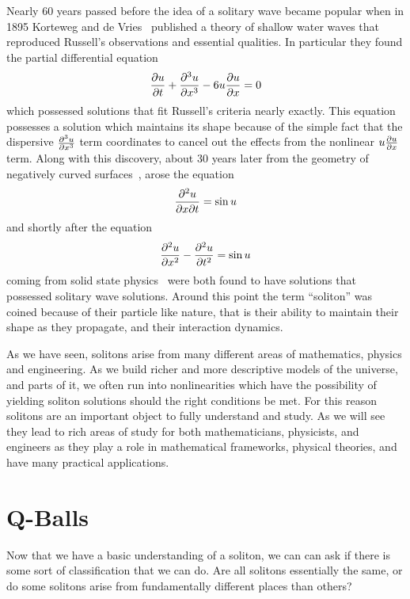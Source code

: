 Nearly 60 years passed before the idea of a solitary wave became popular when
in 1895 Korteweg and de Vries~\cite{KDV} published a theory of shallow water
waves that reproduced Russell's observations and essential qualities. In
particular they found the partial differential equation
\begin{equation}
    \pdv{u}{t} + \pdv[3]{u}{x} - 6 u \pdv{u}{x} = 0
\end{equation}
which possessed solutions that fit Russell's criteria nearly exactly. This
equation possesses a solution which maintains its shape because of the simple
fact that the dispersive \(\pdv[3]{u}{x}\) term coordinates to cancel out the
effects from the nonlinear \(u\pdv{u}{x}\) term. Along with this discovery,
about 30 years later from the geometry of negatively curved
surfaces~\cite{curvedsurf}, arose the equation
\begin{equation}
    \pdv[2]{u}{x}{t} = \sin{u}
\end{equation}
and shortly after the equation
\begin{equation}
    \pdv[2]{u}{x} - \pdv[2]{u}{t} = \sin{u}
\end{equation}
coming from solid state physics~\cite{sinegordon} were both found to have
solutions that possessed solitary wave solutions. Around this point the term
``soliton'' was coined because of their particle like nature, that is their
ability to maintain their shape as they propagate, and their interaction
dynamics.

As we have seen, solitons arise from many different areas of mathematics,
physics and engineering. As we build richer and more descriptive models of the
universe, and parts of it, we often run into nonlinearities which have the
possibility of yielding soliton solutions should the right conditions be met.
For this reason solitons are an important object to fully understand and study.
As we will see they lead to rich areas of study for both mathematicians,
physicists, and engineers as they play a role in mathematical frameworks,
physical theories, and have many practical applications.

\section{Q-Balls}\label{sec:qballintro}
Now that we have a basic understanding of a soliton, we can can ask if there is
some sort of classification that we can do. Are all solitons essentially the
same, or do some solitons arise from fundamentally different places than others?

